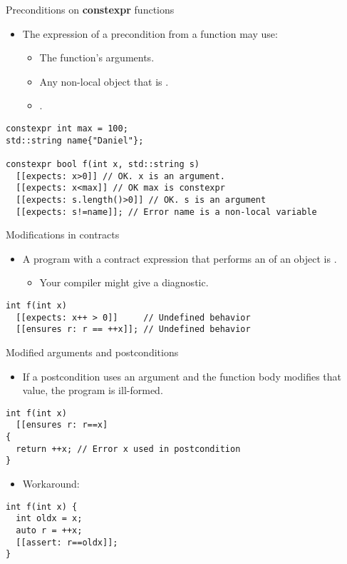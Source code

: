\begin{frame}[t,fragile]{Preconditions on \textbf{constexpr} functions}
\begin{itemize}
  \item The expression of a precondition from a  function may use:
    \begin{itemize}
      \item The function’s arguments.
      \item Any non-local object that is .
      \item {}.
    \end{itemize}
\end{itemize}
\begin{lstlisting}
constexpr int max = 100;
std::string name{"Daniel"};

constexpr bool f(int x, std::string s)
  [[expects: x>0]] // OK. x is an argument.
  [[expects: x<max]] // OK max is constexpr
  [[expects: s.length()>0]] // OK. s is an argument
  [[expects: s!=name]]; // Error name is a non-local variable
\end{lstlisting}
\end{frame}

\begin{frame}[t,fragile]{Modifications in contracts}
\begin{itemize}
  \item A program with a contract expression that performs an
 of an object is .
    \begin{itemize}
      \item Your compiler might give a diagnostic.
    \end{itemize}
\end{itemize}

\vfill\pause
\begin{lstlisting}
int f(int x)
  [[expects: x++ > 0]]     // Undefined behavior
  [[ensures r: r == ++x]]; // Undefined behavior
\end{lstlisting}
\end{frame}

\begin{frame}[t,fragile]{Modified arguments and postconditions}
\begin{itemize}
  \item If a postcondition uses an argument and the function body modifies that
value, the program is ill-formed.
\end{itemize}

\vfill\pause
\begin{lstlisting}
int f(int x)
  [[ensures r: r==x]
{
  return ++x; // Error x used in postcondition
}
\end{lstlisting}
\pause
\begin{itemize}
  \item Workaround:
\end{itemize}
\begin{lstlisting}
int f(int x) {
  int oldx = x;
  auto r = ++x; 
  [[assert: r==oldx]];
}
\end{lstlisting}
\end{frame}

